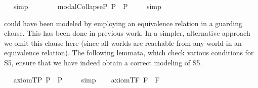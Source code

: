 \begin{isabellebody}
\ %
\endisadelimproof
%
\isatagproof
{}\isamarkupfalse%
\ simp%
\endisatagproof
{\isafoldproof}%
%
\isadelimproof
%
\endisadelimproof
\ \isamarkupfalse%
%
\isadelimproof
\ %
\endisadelimproof
%
\isatagproof
{}\isamarkupfalse%
\ %
%
\endisatagproof
{\isafoldproof}%
%
\isadelimproof
%
\endisadelimproof
\isanewline
\ \isamarkupfalse%
\ modalCollapseP{\isacharcolon}\ {\isachardoublequoteopen}{\isacharbrackleft}{\isasymphi}\isactrlsup P\ \isactrlbold {\isasymrightarrow}\ \isactrlbold {\isasymbox}{\isasymphi}\isactrlsup P{\isacharbrackright}\ {\isacharequal}\ {\isasymtop}{\isachardoublequoteclose}%
\isadelimproof
\ %
\endisadelimproof
%
\isatagproof
{}\isamarkupfalse%
\ simp%
\endisatagproof
{\isafoldproof}%
%
\isadelimproof
%
\endisadelimproof
\ \isamarkupfalse%
%
\isadelimproof
\ %
\endisadelimproof
%
\isatagproof
{}\isamarkupfalse%
\ %
%
\endisatagproof
{\isafoldproof}%
%
\isadelimproof
%
\endisadelimproof
%
\isamarkuptrue%
%
\begin{isamarkuptext}%
\isa{{\isasymbox}} could have been modeled by employing an equivalence relation  in a 
  guarding clause. This has been done in previous work. In a simpler, alternative approach we omit 
  this clause here (since all worlds are reachable from any world in an equivalence relation). The 
  following lemmata, which check various conditions for S5,  ensure that we have indeed 
  obtain a correct modeling of S5.%
\end{isamarkuptext}%
\isamarkuptrue%
\ \isamarkupfalse%
\ axiom{\isacharunderscore}T{\isacharunderscore}P{\isacharcolon}\ {\isachardoublequoteopen}{\isacharbrackleft}\isactrlbold {\isasymbox}{\isasymphi}\isactrlsup P\ \isactrlbold {\isasymrightarrow}\ {\isasymphi}\isactrlsup P{\isacharbrackright}\ {\isacharequal}\ {\isasymtop}{\isachardoublequoteclose}%
\isadelimproof
\ %
\endisadelimproof
%
\isatagproof
{}\isamarkupfalse%
\ simp\ \isamarkupfalse%
%
\endisatagproof
{\isafoldproof}%
%
\isadelimproof
%
\endisadelimproof
\isanewline
\ \isamarkupfalse%
\ axiom{\isacharunderscore}T{\isacharunderscore}F{\isacharcolon}\ {\isachardoublequoteopen}{\isacharbrackleft}\isactrlbold {\isasymbox}{\isasymphi}\isactrlsup F\ \isactrlbold {\isasymrightarrow}\ {\isasymphi}\isactrlsup F{\isacharbrackright}\ {\isacharequal}\ {\isasymtop}{\isachardoublequoteclose}%

\end{isabellebody}
